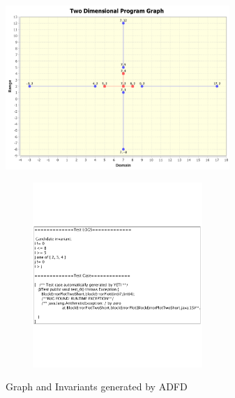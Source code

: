 \documentclass[runningheads,a4paper]{llncs}
\begin{document}
\begin{figure}[ht]
\centering
\includegraphics[width= 8.5cm,height=7cm]{adfdGraph.png}
\includegraphics[width= 8.5cm,height=7cm]{adfdInvariants.png}
\caption{Graph and Invariants generated by ADFD}
\label{fig:ADFD+}
\end{figure}
\end{document}
